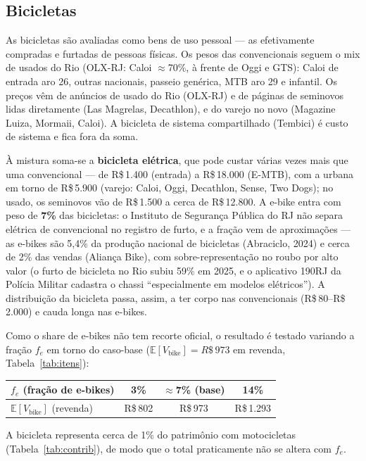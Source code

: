 \documentclass[11pt,a4paper]{article}
\newcommand{\reais}[1]{R\$\,#1}
\begin{document}
\subsection{Bicicletas}
As bicicletas são avaliadas como bens de uso pessoal --- as efetivamente compradas e furtadas de
pessoas físicas. Os pesos das convencionais seguem o mix de usados do Rio (OLX-RJ: Caloi
$\approx$70\%, à frente de Oggi e GTS): Caloi de entrada aro 26, outras nacionais, passeio genérica,
MTB aro 29 e infantil. Os preços vêm de anúncios de usado do Rio (OLX-RJ) e de páginas de seminovos
lidas diretamente (Las Magrelas, Decathlon), e do varejo no novo (Magazine Luiza, Mormaii, Caloi). A
bicicleta de sistema compartilhado (Tembici) é custo de sistema e fica fora da soma.

À mistura soma-se a \textbf{bicicleta elétrica}, que pode custar várias vezes mais que uma
convencional --- de \reais{1.400} (entrada) a \reais{18.000} (E-MTB), com a urbana em torno de
\reais{5.900} (varejo: Caloi, Oggi, Decathlon, Sense, Two Dogs); no usado, os seminovos vão de
\reais{1.500} a cerca de \reais{12.800}. A e-bike entra com peso de \textbf{7\%} das bicicletas: o
Instituto de Segurança Pública do RJ não separa elétrica de convencional no registro de furto, e a
fração vem de aproximações --- as e-bikes são 5,4\% da produção nacional de bicicletas (Abraciclo,
2024) e cerca de 2\% das vendas (Aliança Bike), com sobre-representação no roubo por alto valor (o
furto de bicicleta no Rio subiu 59\% em 2025, e o aplicativo 190RJ da Polícia Militar cadastra o
chassi ``especialmente em modelos elétricos''). A distribuição da bicicleta passa, assim, a ter
corpo nas convencionais (\reais{80}--\reais{2.000}) e cauda longa nas e-bikes.

Como o share de e-bikes não tem recorte oficial, o resultado é testado variando a fração $f_e$ em
torno do caso-base ($\mathbb{E}[V_{\text{bike}}]=\reais{973}$ em revenda, Tabela~\ref{tab:itens}):
\begin{center}\small
\begin{tabular}{lccc}
\toprule
$f_e$ (fração de e-bikes) & 3\% & $\approx$7\% (base) & 14\% \\
\midrule
$\mathbb{E}[V_{\text{bike}}]$ (revenda) & \reais{802} & \reais{973} & \reais{1.293} \\
\bottomrule
\end{tabular}
\end{center}
A bicicleta representa cerca de 1\% do patrimônio com motocicletas (Tabela~\ref{tab:contrib}), de
modo que o total praticamente não se altera com $f_e$.
\end{document}
